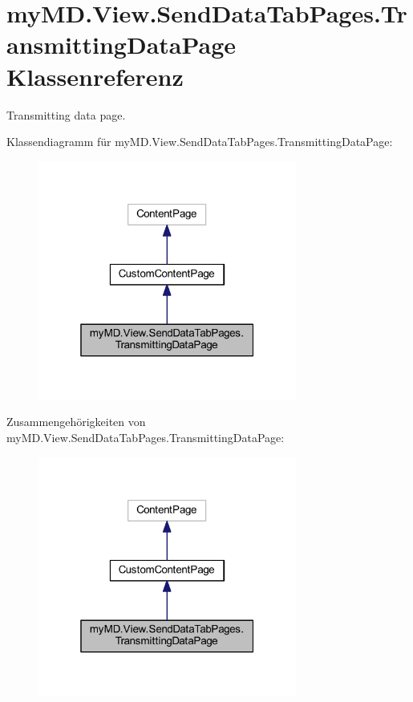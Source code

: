 \hypertarget{classmy_m_d_1_1_view_1_1_send_data_tab_pages_1_1_transmitting_data_page}{}\section{my\+M\+D.\+View.\+Send\+Data\+Tab\+Pages.\+Transmitting\+Data\+Page Klassenreferenz}
\label{classmy_m_d_1_1_view_1_1_send_data_tab_pages_1_1_transmitting_data_page}


Transmitting data page.  




Klassendiagramm für my\+M\+D.\+View.\+Send\+Data\+Tab\+Pages.\+Transmitting\+Data\+Page\+:\nopagebreak
\begin{figure}[H]
\begin{center}
\leavevmode
\includegraphics[width=241pt]{classmy_m_d_1_1_view_1_1_send_data_tab_pages_1_1_transmitting_data_page__inherit__graph}
\end{center}
\end{figure}


Zusammengehörigkeiten von my\+M\+D.\+View.\+Send\+Data\+Tab\+Pages.\+Transmitting\+Data\+Page\+:\nopagebreak
\begin{figure}[H]
\begin{center}
\leavevmode
\includegraphics[width=241pt]{classmy_m_d_1_1_view_1_1_send_data_tab_pages_1_1_transmitting_data_page__coll__graph}
\end{center}
\end{figure}
